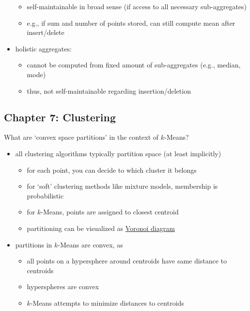 \documentclass[12pt]{article}
\begin{document}
\begin{itemize}[left=0pt, nosep]
\begin{itemize}[left=0pt, nosep]
		\item self-maintainable in broad sense (if access to all necessary sub-aggregates)
		\item e.g., if sum and number of points stored, can still compute mean after insert/delete
	\end{itemize}
	\item holistic aggregates:
	\begin{itemize}[left=0pt, nosep]
		\item cannot be computed from fixed amount of sub-aggregates (e.g., median, mode)
		\item thus, not self-maintainable regarding insertion/deletion
	\end{itemize}
\end{itemize}

\subsection*{Chapter 7: Clustering}

\begin{question}
	What are `convex space partitions' in the context of $k$-Means?
\end{question}

\begin{itemize}[left=0pt, nosep]
	\item all clustering algorithms typically partition space (at least implicitly)
	\begin{itemize}[left=0pt, nosep]
		\item for each point, you can decide to which cluster it belongs
		\item for `soft' clustering methods like mixture models, membership is probabilistic
		\item for $k$-Means, points are assigned to closest centroid
		\item partitioning can be visualized as \href{https://en.wikipedia.org/wiki/Voronoi_diagram}{Voronoi diagram}
	\end{itemize}
	\item partitions in $k$-Means are convex, as
	\begin{itemize}[left=0pt, nosep]
		\item all points on a hypersphere around centroids have same distance to centroids
		\item hyperspheres are convex
		\item $k$-Means attempts to minimize distances to centroids
	\end{itemize}
\end{itemize}
\end{document}

